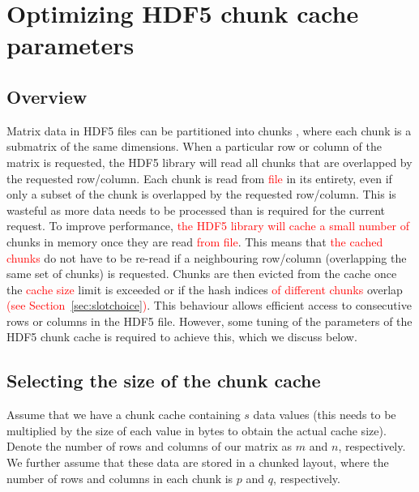 \documentclass{article}
\newcommand{\revised}[1]{\textcolor{red}{#1}}
\begin{document}
\section{Optimizing HDF5 chunk cache parameters}
\label{sec:layoutoptim}

\subsection{Overview}
Matrix data in HDF5 files can be partitioned into chunks \cite{hdf5chunk}, where each chunk is a submatrix of the same dimensions.
When a particular row or column of the matrix is requested, the HDF5 library will read all chunks that are overlapped by the requested row/column.
Each chunk is read from \revised{file} in its entirety, even if only a subset of the chunk is overlapped by the requested row/column.
This is wasteful as more data needs to be processed than is required for the current request.
To improve performance, \revised{the HDF5 library will cache a small number of} chunks in memory once they are read \revised{from file}.
This means that \revised{the cached chunks} do not have to be re-read if a neighbouring row/column (overlapping the same set of chunks) is requested.
Chunks are then evicted from the cache once the \revised{cache size} limit is exceeded or if the hash indices \revised{of different chunks} overlap \revised{(see Section~\ref{sec:slotchoice})}.
This behaviour allows efficient access to consecutive rows or columns in the HDF5 file.
However, some tuning of the parameters of the HDF5 chunk cache is required to achieve this, which we discuss below.

\subsection{Selecting the size of the chunk cache}
Assume that we have a chunk cache containing $s$ data values (this needs to be multiplied by the size of each value in bytes to obtain the actual cache size).
Denote the number of rows and columns of our matrix as $m$ and $n$, respectively. 
We further assume that these data are stored in a chunked layout, where the number of rows and columns in each chunk is $p$ and $q$, respectively.
\end{document}
